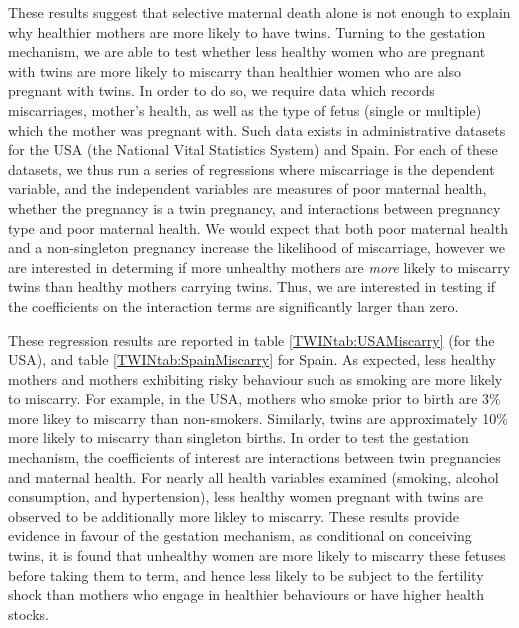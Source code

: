 These results suggest that selective maternal death alone is not enough to 
explain why healthier mothers are more likely to have twins. Turning to the 
gestation mechanism, we are able to test whether less healthy women who are 
pregnant with twins are more likely to miscarry than healthier women who are 
also pregnant with twins.  In order to do so, we require data which records
miscarriages, mother's health, as well as the type of fetus (single or 
multiple) which the mother was pregnant with.  Such data exists in 
administrative datasets for the USA (the National Vital Statistics System) and
Spain. For each of these datasets, we thus run a series of regressions where 
miscarriage is the dependent variable, and the independent variables are 
measures of poor maternal health, whether the pregnancy is a twin pregnancy, 
and interactions between pregnancy type and poor maternal health.  We would 
expect that both poor maternal health and a non-singleton pregnancy increase the 
likelihood of miscarriage, however we are interested in determing if more 
unhealthy mothers are \emph{more} likely to miscarry twins than healthy mothers 
carrying twins.  Thus, we are interested in testing if the coefficients on the 
interaction terms are significantly larger than zero.

These regression results are reported in table \ref{TWINtab:USAMiscarry} (for
the USA), and table \ref{TWINtab:SpainMiscarry} for Spain. As expected, less
healthy mothers and mothers exhibiting risky behaviour such as smoking are more 
likely to miscarry.  For example, in the USA, mothers who smoke prior to birth 
are 3\% more likey to miscarry than non-smokers.  Similarly, twins are 
approximately 10\% more likely to miscarry than singleton births. In order to
test the gestation mechanism, the coefficients of interest are interactions
between twin pregnancies and maternal health.  For nearly all health variables 
examined (smoking, alcohol consumption, and hypertension), less healthy women
pregnant with twins are observed to be additionally more likley to miscarry.
These results provide evidence in favour of the gestation mechanism, as 
conditional on conceiving twins, it is found that unhealthy women are more 
likely to miscarry these fetuses before taking them to term, and hence less
likely to be subject to the fertility shock than mothers who engage in 
healthier behaviours or have higher health stocks.

